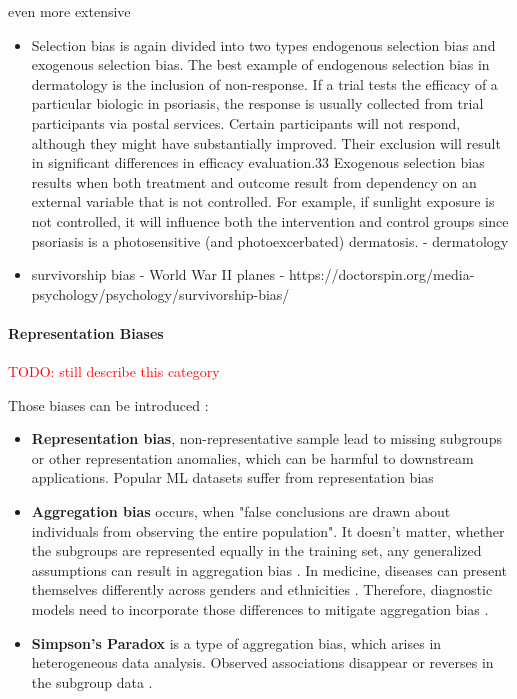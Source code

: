 \documentclass[12pt, a4paper, oneside]{book}   	%
\renewcommand{\todo}[1]{\textcolor{red}{TODO: #1}}
\newif\ifrawcitationactive
\newcommand{\rawcitationend}{\color{black}\rawcitationactivefalse}
\begin{document}
				even more extensive
				\begin{itemize}
					\item Selection bias is again divided into two types endogenous selection bias and exogenous selection bias. The best example of endogenous selection bias in dermatology is the inclusion of non-response. If a trial tests the efficacy of a particular biologic in psoriasis, the response is usually collected from trial participants via postal services. Certain participants will not respond, although they might have substantially improved. Their exclusion will result in significant differences in efficacy evaluation.33
					Exogenous selection bias results when both treatment and outcome result from dependency on an external variable that is not controlled. For example, if sunlight exposure is not controlled, it will influence both the intervention and control groups since psoriasis is a photosensitive (and photoexcerbated) dermatosis. \autocite{Chakraborty_2024} - dermatology
					
					
					\item survivorship bias - World War II planes \autocite{Silfwer_2017} - https://doctorspin.org/media-psychology/psychology/survivorship-bias/
				\end{itemize}
					
				\rawcitationend
					
				\paragraph{Representation Biases}
				\todo{still describe this category} 
				
				Those biases can be introduced :
				\begin{itemize}
					\item \textbf{Representation bias}, non-representative sample lead to missing subgroups or other representation anomalies, which can be harmful to downstream applications. Popular ML datasets suffer from representation bias \autocites{Mehrabi_2021}{M142_}
					\item \textbf{Aggregation bias} occurs, when "false conclusions are drawn about individuals from observing the entire population". It doesn't matter, whether the subgroups are represented equally in the training set, any generalized assumptions can result in aggregation bias \autocite{Mehrabi_2021}. In medicine, diseases can present themselves differently across genders and ethnicities \autocite{M144_Suresh_2021}. Therefore, diagnostic models need to incorporate those differences to mitigate aggregation bias \autocite{Mehrabi_2021}.
					\item \textbf{Simpson's Paradox} is a type of aggregation bias, which arises in heterogeneous data analysis. Observed associations disappear or reverses in the subgroup data \autocite{Mehrabi_2021}.
				\end{itemize}
				
\end{document}
